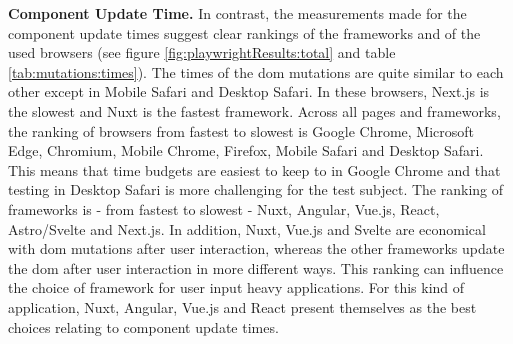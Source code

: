 \documentclass[a4paper, 12pt]{article}
\begin{document}
\textbf{Component Update Time.} In contrast, the measurements made for the component update times suggest clear rankings of the frameworks and of the used browsers (see figure \ref{fig:playwrightResults:total} and table \ref{tab:mutations:times}).
The times of the \acrshort{dom} mutations are quite similar to each other except in Mobile Safari and Desktop Safari.
In these browsers, Next.js is the slowest and Nuxt is the fastest framework.
Across all pages and frameworks, the ranking of browsers from fastest to slowest is Google Chrome, Microsoft Edge, Chromium, Mobile Chrome, Firefox, Mobile Safari and Desktop Safari.
This means that time budgets are easiest to keep to in Google Chrome and that testing in Desktop Safari is more challenging for the test subject.
The ranking of frameworks is - from fastest to slowest - Nuxt, Angular, Vue.js, React, Astro/Svelte and Next.js.
In addition, Nuxt, Vue.js and Svelte are economical with \acrshort{dom} mutations after user interaction, whereas the other frameworks update the \acrshort{dom} after user interaction in more different ways.
This ranking can influence the choice of framework for user input heavy applications.
For this kind of application, Nuxt, Angular, Vue.js and React present themselves as the best choices relating to component update times.
\end{document}
